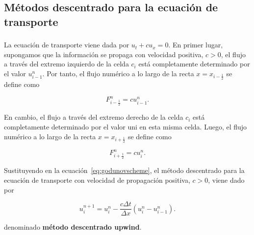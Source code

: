 \subsection{Métodos descentrado para la ecuación de transporte}

\begin{frame}
    \frametitle{\subsecname}

    La ecuación de transporte viene dada por $u_{t}+cu_{x}=0$.
    En primer lugar, supongamos que la información se propaga con
    velocidad positiva, $c>0$, el flujo a través del extremo
    izquierdo de la celda $c_{i}$ está completamente determinado por el
    valor $u^{n}_{i-1}$.
    Por tanto, el flujo numérico a lo largo de la recta
    $x=x_{i-\frac{1}{2}}$ se define como

    \begin{equation*}
        F^{n}_{i-\frac{1}{2}}=
        cu^{n}_{i-1}.
    \end{equation*}

    En cambio, el flujo a través del extremo derecho de la celda $c_{i}$
    está completamente determinado por el valor uni en esta misma celda.
    Luego, el flujo numérico a lo largo de la recta $x=x_{i+\frac{1}{2}}$
    se define como

    \begin{equation*}
        F^{n}_{i+\frac{1}{2}}=
        cu^{n}_{i}.
    \end{equation*}

    Sustituyendo en la ecuación~\eqref{eq:godunovscheme}, el método
    descentrado para la ecuación de transporte con velocidad de
    propagación positiva, $c>0$, viene dado por

    \begin{equation}\label{eq:upwind}
        u^{n+1}_{i}=
        u^{n}_{i}-
        \frac{c\Delta t}{\Delta x}
        \left(
        u^{n}_{i}-
        u^{n}_{i-1}
        \right).
    \end{equation}

    denominado \textbf{método descentrado upwind}.
\end{frame}

